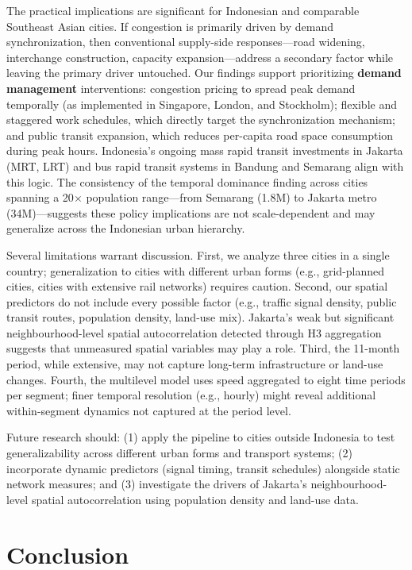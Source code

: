 \documentclass[12pt,a4paper]{article}
\begin{document}
The practical implications are significant for Indonesian and comparable Southeast Asian cities. If congestion is primarily driven by demand synchronization, then conventional supply-side responses---road widening, interchange construction, capacity expansion---address a secondary factor while leaving the primary driver untouched. Our findings support prioritizing \textbf{demand management} interventions: congestion pricing to spread peak demand temporally (as implemented in Singapore, London, and Stockholm); flexible and staggered work schedules, which directly target the synchronization mechanism; and public transit expansion, which reduces per-capita road space consumption during peak hours. Indonesia's ongoing mass rapid transit investments in Jakarta (MRT, LRT) and bus rapid transit systems in Bandung and Semarang align with this logic. The consistency of the temporal dominance finding across cities spanning a 20$\times$ population range---from Semarang (1.8M) to Jakarta metro (34M)---suggests these policy implications are not scale-dependent and may generalize across the Indonesian urban hierarchy.

Several limitations warrant discussion. First, we analyze three cities in a single country; generalization to cities with different urban forms (e.g., grid-planned cities, cities with extensive rail networks) requires caution. Second, our spatial predictors do not include every possible factor (e.g., traffic signal density, public transit routes, population density, land-use mix). Jakarta's weak but significant neighbourhood-level spatial autocorrelation detected through H3 aggregation suggests that unmeasured spatial variables may play a role. Third, the 11-month period, while extensive, may not capture long-term infrastructure or land-use changes. Fourth, the multilevel model uses speed aggregated to eight time periods per segment; finer temporal resolution (e.g., hourly) might reveal additional within-segment dynamics not captured at the period level.

Future research should: (1) apply the pipeline to cities outside Indonesia to test generalizability across different urban forms and transport systems; (2) incorporate dynamic predictors (signal timing, transit schedules) alongside static network measures; and (3) investigate the drivers of Jakarta's neighbourhood-level spatial autocorrelation using population density and land-use data.

\section{Conclusion}
\end{document}
